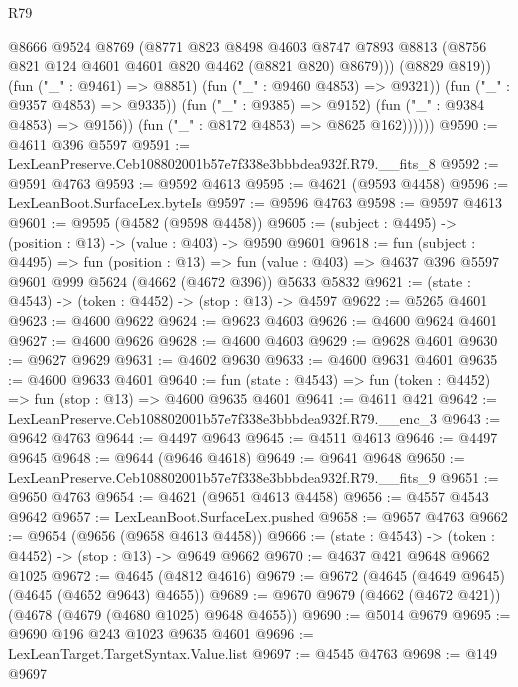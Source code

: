 \begin{lexlean}{R79}
\begin{coremodule}
                        @8666
                        @9524
                        @8769
                        (@8771
                          @823
                          @8498
                          @4603
                          @8747
                          @7893
                          @8813
                          (@8756 @821 @124 @4601 @4601 @820 @4462 (@8821 @820) @8679)))
                      (@8829 @819))
                    (fun ("_" : @9461) => @8851)
                    (fun ("_" : @9460 @4853) => @9321))
                  (fun ("_" : @9357 @4853) => @9335))
                (fun ("_" : @9385) => @9152)
                (fun ("_" : @9384 @4853) => @9156))
              (fun ("_" : @8172 @4853) => @8625 @162))))))
@9590 := @4611 @396 @5597
@9591 := LexLeanPreserve.Ceb108802001b57e7f338e3bbbdea932f.R79.__fits_8
@9592 := @9591 @4763
@9593 := @9592 @4613
@9595 := @4621 (@9593 @4458)
@9596 := LexLeanBoot.SurfaceLex.byteIs
@9597 := @9596 @4763
@9598 := @9597 @4613
@9601 := @9595 (@4582 (@9598 @4458))
@9605 := (subject : @4495) -> (position : @13) -> (value : @403) -> @9590 @9601
@9618 := fun (subject : @4495) =>
  fun (position : @13) =>
  fun (value : @403) => @4637 @396 @5597 @9601 @999 @5624 (@4662 (@4672 @396)) @5633 @5832
@9621 := (state : @4543) -> (token : @4452) -> (stop : @13) -> @4597
@9622 := @5265 @4601
@9623 := @4600 @9622
@9624 := @9623 @4603
@9626 := @4600 @9624 @4601
@9627 := @4600 @9626
@9628 := @4600 @4603
@9629 := @9628 @4601
@9630 := @9627 @9629
@9631 := @4602 @9630
@9633 := @4600 @9631 @4601
@9635 := @4600 @9633 @4601
@9640 := fun (state : @4543) => fun (token : @4452) => fun (stop : @13) => @4600 @9635 @4601
@9641 := @4611 @421
@9642 := LexLeanPreserve.Ceb108802001b57e7f338e3bbbdea932f.R79.__enc_3
@9643 := @9642 @4763
@9644 := @4497 @9643
@9645 := @4511 @4613
@9646 := @4497 @9645
@9648 := @9644 (@9646 @4618)
@9649 := @9641 @9648
@9650 := LexLeanPreserve.Ceb108802001b57e7f338e3bbbdea932f.R79.__fits_9
@9651 := @9650 @4763
@9654 := @4621 (@9651 @4613 @4458)
@9656 := @4557 @4543 @9642
@9657 := LexLeanBoot.SurfaceLex.pushed
@9658 := @9657 @4763
@9662 := @9654 (@9656 (@9658 @4613 @4458))
@9666 := (state : @4543) -> (token : @4452) -> (stop : @13) -> @9649 @9662
@9670 := @4637 @421 @9648 @9662 @1025
@9672 := @4645 (@4812 @4616)
@9679 := @9672 (@4645 (@4649 @9645) (@4645 (@4652 @9643) @4655))
@9689 := @9670 @9679 (@4662 (@4672 @421)) (@4678 (@4679 (@4680 @1025) @9648 @4655))
@9690 := @5014 @9679
@9695 := @9690 @196 @243 @1023 @9635 @4601
@9696 := LexLeanTarget.TargetSyntax.Value.list
@9697 := @4545 @4763
@9698 := @149 @9697

\end{coremodule}
\end{lexlean}

